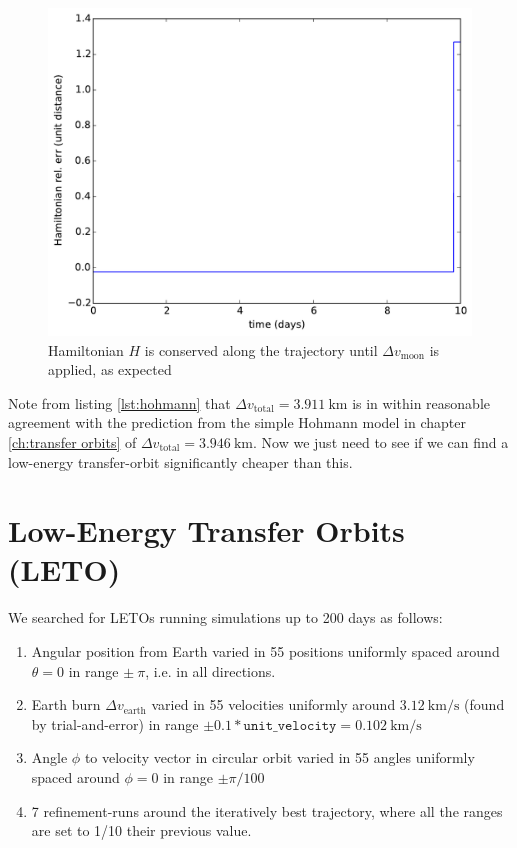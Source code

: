 \begin{figure}[ht!]
\centering
\includegraphics[scale=0.35]{fig/hohmann/H_Hohmann.pdf}
\caption{Hamiltonian $H$ is conserved along the trajectory until $\Delta v_{\text{moon}}$ is applied, as expected}
\label{fig:hohmann-H}
\end{figure}
Note from listing \ref{lst:hohmann} that $\Delta v_{\text{total}} = \SI{3.911}{\km}$ is in within reasonable agreement with the prediction from the simple Hohmann model in chapter \ref{ch:transfer orbits} of $\Delta v_{\text{total}} = \SI{3.946}{\km}$. Now we just need to see if we can find a low-energy transfer-orbit significantly cheaper than this.


\section{Low-Energy Transfer Orbits (LETO)}
We searched for LETOs running simulations up to 200 days as follows:
\begin{enumerate}
    \item Angular position from Earth varied in 55 positions uniformly spaced around $\theta=0$ in range $\pm\ \pi$, i.e. in all directions.
    \item Earth burn $\Delta v_{\text{earth}}$ varied in 55 velocities uniformly around $\SI{3.12}{\km\per\s}$ (found by trial-and-error) in range $\pm 0.1*\texttt{unit\_velocity} = \SI{0.102}{\km\per\s}$
    \item Angle $\phi$ to velocity vector in circular orbit varied in 55 angles uniformly spaced around $\phi=0$ in range $\pm \pi/100$
    \item 7 refinement-runs around the iteratively best trajectory, where all the ranges are set to 1/10 their previous value.
\end{enumerate}

